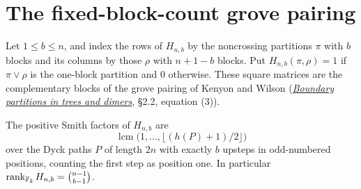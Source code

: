 \section{The fixed-block-count grove pairing}

Let \(1\le b\le n\), and index the rows of \(H_{n,b}\) by the
noncrossing partitions \(\pi\) with \(b\) blocks and its columns by
those \(\rho\) with \(n+1-b\) blocks. Put \(H_{n,b}(\pi,\rho)=1\)
if \(\pi\vee\rho\) is the one-block partition and \(0\) otherwise.
These square matrices are the complementary blocks of the grove
pairing of Kenyon and Wilson
(\href{https://arxiv.org/abs/math/0608422}{\emph{Boundary partitions
in trees and dimers}}, \S2.2, equation (3)).

\begin{corollary}\label{cor:grove-block}
The positive Smith factors of \(H_{n,b}\) are
\[
 \operatorname{lcm}\bigl(1,\ldots,\lfloor(h(P)+1)/2\rfloor\bigr)
\]
over the Dyck paths \(P\) of length \(2n\) with exactly \(b\) upsteps
in odd-numbered positions, counting the first step as position one.
In particular \(\operatorname{rank}_{\mathbb F_2}H_{n,b}=\binom{n-1}{b-1}\).
\end{corollary}

